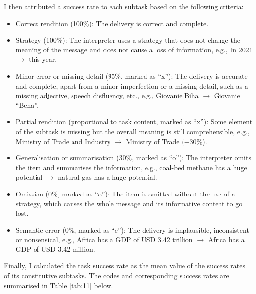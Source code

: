 I then attributed a success rate to each subtask based on the following criteria:

\begin{itemize}
    \item Correct rendition (100\%): The delivery is correct and complete.
 \item Strategy (100\%): The interpreter uses a strategy that does not change the meaning of the message and does not cause a loss of information, e.g., In 2021 $\longrightarrow$ this year.
\item Minor error or missing detail (95\%, marked as ``x''): The delivery is accurate and complete, apart from a minor imperfection or a missing detail, such as a missing adjective, speech disfluency, etc., e.g.,	Giovanie Biha $\longrightarrow$ Giovanie ``Beha''.
\item Partial rendition (proportional to task content, marked as ``x''): Some element of the subtask is missing but the overall meaning is still comprehensible, e.g., Ministry of Trade and Industry $\longrightarrow$ Ministry of Trade ($-$30\%).
\item Generalisation or summarisation (30\%, marked as ``o''): The interpreter omits the item and summarises the information, e.g., coal-bed methane has a huge potential $\longrightarrow$ natural gas has a huge potential.
\item Omission (0\%, marked as ``o''): The item is omitted without the use of a strategy, which causes the whole message and its informative content to go lost.
\item Semantic error (0\%, marked as ``e''): The delivery is implausible, inconsistent or nonsensical, e.g., Africa has a GDP of USD 3.42 trillion $\longrightarrow$ Africa has a GDP of USD 3.42 million.
\end{itemize}

Finally, I calculated the task success rate as the mean value of the success rates of its constitutive subtasks. The codes and corresponding success rates are summarised in Table \ref{tab:11} below.


